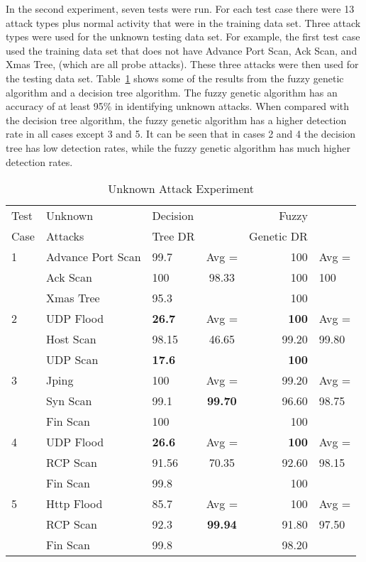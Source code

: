 \documentclass{sig-alternate}
\begin{document}
In the second experiment, seven tests were run. For each test case there were 13 attack types plus normal activity that were in the training data set. Three attack types were used for the unknown testing data set. For example, the first test case used the training data set that does not have Advance Port Scan, Ack Scan, and Xmas Tree, (which are all probe attacks). These three attacks were then used for the testing data set. Table~\ref{tab:fuzGenExp2} shows some of the results from the fuzzy genetic algorithm and a decision tree algorithm. The fuzzy genetic algorithm has an accuracy of at least 95\% in identifying unknown attacks. When compared with the decision tree algorithm, the fuzzy genetic algorithm has a higher detection rate in all cases except 3 and 5. It can be seen that in cases 2 and 4 the decision tree has low detection rates, while the fuzzy genetic algorithm has much higher detection rates.


\begin{table}
\caption{Unknown Attack Experiment}
\begin{tabular}{|lllcrl|} \hline
Test & Unknown & Decision & & Fuzzy & \\
Case & Attacks & Tree DR & & Genetic DR & \\ \hline

1 & Advance Port Scan & 99.7 & Avg = & 100 & Avg =\\
  & Ack Scan          & 100  & 98.33 & 100 & 100\\
  & Xmas Tree         & 95.3 &       & 100 &\\ \hline

2 & UDP Flood & \textbf{26.7} & Avg = & \textbf{100} & Avg =\\
  & Host Scan & 98.15         & 46.65 & 99.20        & 99.80\\
  & UDP Scan  & \textbf{17.6} &       & \textbf{100} &\\ \hline

3 & Jping    & 100 & Avg =          & 99.20 & Avg =\\
  & Syn Scan & 99.1& \textbf{99.70} & 96.60 & 98.75\\
  & Fin Scan & 100 &                & 100 &\\ \hline

4 & UDP Flood & \textbf{26.6} & Avg = & \textbf{100} & Avg =\\
  & RCP Scan  & 91.56         & 70.35 & 92.60        & 98.15\\
  & Fin Scan  & 99.8          &       & 100          &\\ \hline

5 & Http Flood & 85.7& Avg =          & 100 & Avg =\\
  & RCP Scan  & 92.3 & \textbf{99.94} & 91.80 & 97.50\\
  & Fin Scan  & 99.8 &                & 98.20 &\\
\hline\end{tabular}
\label{tab:fuzGenExp2}
\end{table}
\end{document}
